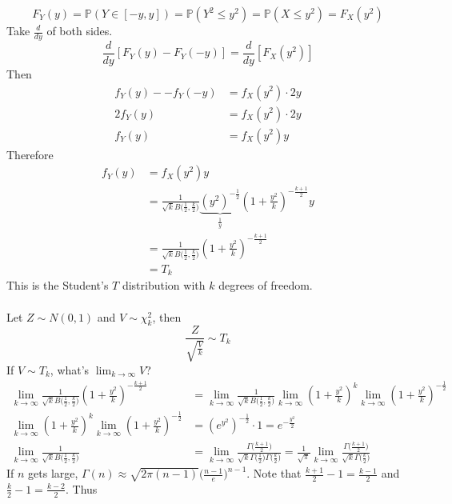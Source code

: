 \documentclass[12pt]{article}
\newcommand{\prob}[1]{\mathbb{P}(#1)}
\begin{document}
$$F_Y(y) = \prob{Y \in [-y, y]} = \prob{Y^2 \leq y^2} = \prob{X \leq y^2} = F_X(y^2)$$ 
Take $\frac{d}{dy}$ of both sides. 
$$ \frac{d}{dy} [F_Y(y) - F_Y(-y)] = \frac{d}{dy}[F_X(y^2)] $$ Then $$ \begin{aligned} f_Y(y) - -f_Y(-y) &= f_X(y^2) \cdot 2y \\ 2f_Y(y) &= f_X(y^2) \cdot 2y \\ f_Y(y) &= f_X(y^2)y \end{aligned} $$ 
Therefore $$ \begin{aligned} f_Y(y) &= f_X(y^2)y \\ &= \frac{1}{\sqrt{k} B\Big( \frac{1}{2}, \frac{k}{2}\Big)} \underbrace{(y^2)^{-\frac{1}{2}}}_{\frac{1}{y}}(1 + \frac{y^2}{k})^{-\frac{k+1}{2}}y \\ &= \frac{1}{\sqrt{k}B\Big( \frac{1}{2}, \frac{k}{2}\Big)}(1 + \frac{y^2}{k})^{-\frac{k+1}{2}} \\ &= T_k \end{aligned} $$ This is the Student's $T$ distribution with $k$ degrees of freedom. \\~\\
Let $Z \sim N(0,1)$ and $V \sim \chi_k^2$, then $$\frac{Z}{\sqrt{\frac{V}{k}}} \sim T_k $$ 
If $V \sim T_k$, what's $\lim_{k \to \infty} V$? $$ \begin{aligned} 
\lim_{k \to \infty} \frac{1}{\sqrt{k} B\Big( \frac{1}{2}, \frac{k}{2}\Big)} (1 + \frac{y^2}{k})^{-\frac{k+1}{2}} &= \lim_{k \to \infty} \frac{1}{\sqrt{k} B\Big( \frac{1}{2}, \frac{k}{2}\Big)} \lim_{k \to \infty} (1 + \frac{y^2}{k})^k \lim_{k \to \infty} (1 + \frac{y^2}{k})^{-\frac{1}{2}} \\ \lim_{k \to \infty} (1 + \frac{y^2}{k})^k \lim_{k \to \infty} (1 + \frac{y^2}{k})^{-\frac{1}{2}} &= (e^{y^2})^{-\frac{1}{2}} \cdot 1 = e^{-\frac{y^2}{2}} \\ \lim_{k \to \infty} \frac{1}{\sqrt{k} B\Big( \frac{1}{2}, \frac{k}{2}\Big)} &= \lim_{k \to \infty} \frac{\Gamma\Big( \frac{k+1}{2}\Big)}{\sqrt{k} \Gamma\Big( \frac{1}{2}\Big)\Gamma\Big(\frac{k}{2}\Big)} = \frac{1}{\sqrt{\pi}} \lim_{k \to \infty} \frac{\Gamma\Big( \frac{k+1}{2}\Big)}{\sqrt{k}\Gamma\Big( \frac{k}{2}\Big)} \end{aligned} $$ 
If $n$ gets large, $\Gamma(n) \approx \sqrt{2\pi(n - 1)}\Big( \frac{n-1}{e}\Big)^{n-1}$. Note that $\frac{k+1}{2} - 1 = \frac{k-1}{2}$ and $\frac{k}{2} - 1 = \frac{k-2}{2}$. Thus 
\end{document}
